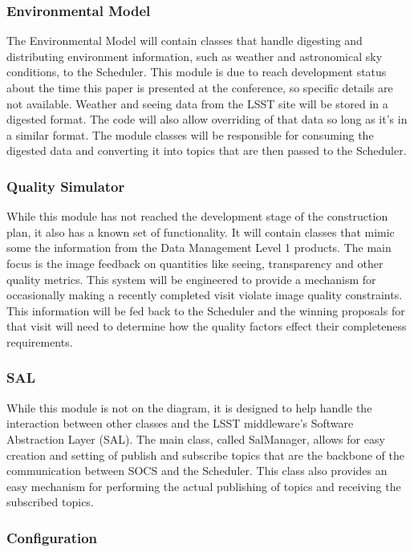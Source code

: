 \documentclass[]{spie}  %
\begin{document}
\subsubsection{Environmental Model}

The Environmental Model will contain classes that handle digesting and distributing environment information, such as weather and astronomical sky conditions, to the Scheduler. This module is due to reach development status about the time this paper is presented at the conference, so specific details are not available. Weather and seeing data from the LSST site will be stored in a digested format. The code will also allow overriding of that data so long as it's in a similar format. The module classes will be responsible for consuming the digested data and converting it into topics that are then passed to the Scheduler.

\subsubsection{Quality Simulator}

While this module has not reached the development stage of the construction plan, it also has a known set of functionality. It will contain classes that mimic some the information from the Data Management Level 1 products\cite{DPDD}. The main focus is the image feedback on quantities like seeing, transparency and other quality metrics. This system will be engineered to provide a mechanism for occasionally making a recently completed visit violate image quality constraints. This information will be fed back to the Scheduler and the winning proposals for that visit will need to determine how the quality factors effect their completeness requirements.

\subsubsection{SAL}

While this module is not on the diagram, it is designed to help handle the interaction between other classes and the LSST middleware's Software Abstraction Layer (SAL). The main class, called SalManager, allows for easy creation and setting of publish and subscribe topics that are the backbone of the communication between SOCS and the Scheduler. This class also provides an easy mechanism for performing the actual publishing of topics and receiving the subscribed topics.

\subsubsection{Configuration}
\end{document}
